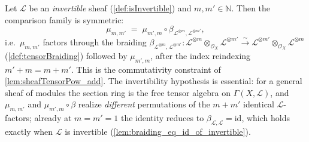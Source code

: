 \begin{lemma}\leanok
  \label{lem:tensorPowAdd_comm}
  Let \(\mathcal{L}\) be an \emph{invertible} sheaf (\cref{def:isInvertible}) and
  \(m, m' \in \mathbb{N}\). Then the comparison family is symmetric:
  \[
    \mu_{m,m'} \;=\;
      \mu_{m',m} \circ
      \beta_{\mathcal{L}^{\otimes m}, \mathcal{L}^{\otimes m'}},
  \]
  i.e.\ \(\mu_{m,m'}\) factors through the braiding
  \(\beta_{\mathcal{L}^{\otimes m},\mathcal{L}^{\otimes m'}} :
  \mathcal{L}^{\otimes m} \otimes_{\mathcal{O}_X} \mathcal{L}^{\otimes m'}
  \xrightarrow{\sim}
  \mathcal{L}^{\otimes m'} \otimes_{\mathcal{O}_X} \mathcal{L}^{\otimes m}\)
  (\cref{def:tensorBraiding}) followed by \(\mu_{m',m}\), after the index
  reindexing \(m' + m = m + m'\). This is the commutativity constraint of
  \cref{lem:sheafTensorPow_add}. The invertibility hypothesis is essential: for a
  general sheaf of modules the section ring is the free tensor algebra on
  \(\Gamma(X,\mathcal{L})\), and \(\mu_{m,m'}\) and \(\mu_{m',m} \circ \beta\)
  realize \emph{different} permutations of the \(m + m'\) identical
  \(\mathcal{L}\)-factors; already at \(m = m' = 1\) the identity reduces to
  \(\beta_{\mathcal{L},\mathcal{L}} = \mathrm{id}\), which holds exactly when
  \(\mathcal{L}\) is invertible (\cref{lem:braiding_eq_id_of_invertible}).
\end{lemma}

